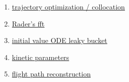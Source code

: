 \documentclass[12pt,letterpaper,noanswers]{exam}
\begin{document}
\begin{enumerate}
\item \href{https://epubs-siam-org.ezp-prod1.hul.harvard.edu/doi/10.1137/16M1062569}{trajectory optimization / collocation}

\item \href{https://epubs-siam-org.ezp-prod1.hul.harvard.edu/doi/10.1137/15M1044990}{Rader's fft}

\item \href{https://epubs-siam-org.ezp-prod1.hul.harvard.edu/doi/10.1137/15M1032351}{initial value ODE leaky bucket}


\item \href{https://epubs-siam-org.ezp-prod1.hul.harvard.edu/doi/10.1137/151004707}{kinetic parameters}


\item \href{https://epubs-siam-org.ezp-prod1.hul.harvard.edu/doi/10.1137/140991996}{flight path reconstruction}
\end{enumerate}







\end{document}
